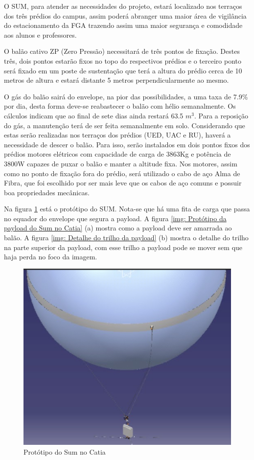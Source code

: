 O SUM, para atender as necessidades do projeto, estará localizado nos terraços dos três prédios do campus, assim poderá abranger uma maior área de vigilância do estacionamento da FGA trazendo assim uma maior segurança e comodidade aos alunos e professores.

O balão cativo ZP (Zero Pressão) necessitará de três pontos de fixação. Destes três, dois pontos estarão fixos no topo do respectivos prédios e o terceiro ponto será fixado em um poste de sustentação que terá a altura do prédio cerca de 10 metros de altura e estará distante 5 metros perpendicularmente ao mesmo.

O gás do balão sairá do envelope, na pior das possibilidades, a uma taxa de 7.9\% por dia, desta forma deve-se reabastecer o balão com hélio semanalmente. Os cálculos indicam que ao final de sete dias ainda restará 63.5 $m^{3}$. Para a reposição do gás, a manutenção terá de ser feita semanalmente em solo. Considerando que estas serão realizadas nos terraços dos prédios (UED, UAC e RU), haverá a necessidade de descer o balão. Para isso, serão instalados em dois pontos fixos dos prédios motores elétricos com capacidade de carga de 3863Kg e potência de 3800W capazes de puxar o balão e manter a altitude fixa. Nos motores, assim como no ponto de fixação fora do prédio, será utilizado o cabo de aço Alma de Fibra, que foi escolhido por ser mais leve que os cabos de aço comuns e possuir boa propriedades mecânicas.

Na figura \ref{img: Protótipo do Sum no Catia} está o protótipo do SUM. Nota-se que há uma fita de carga que passa no equador do envelope que segura a payload. A figura \ref{img: Protótipo da payload do Sum no Catia}  (a)  mostra como a payload deve ser amarrada ao balão. A figura \ref{img: Detalhe do trilho da payload} (b) mostra o detalhe do trilho na parte superior da payload, com esse trilho a payload pode se mover sem que haja perda no foco da imagem.
\begin{figure}[htp]
	\centering
	\includegraphics[scale=0.50]{figuras/catiadobalao}
	\caption{Protótipo do Sum no Catia}
	\label{img: Protótipo do Sum no Catia}
\end{figure}
 
